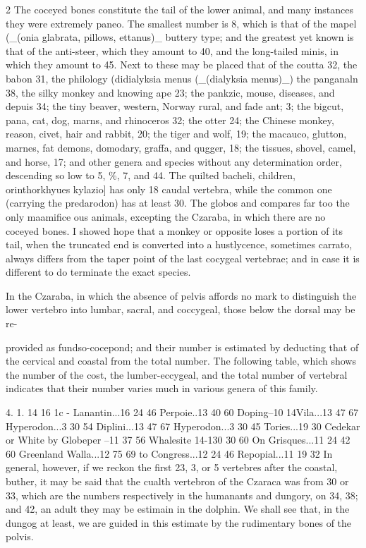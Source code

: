 \documentclass[10pt]{article}
\begin{document}
\begin{multicols}{2}
The coceyed bones constitute the tail of the lower animal, and many instances they were extremely paneo. The smallest number is 8, which is that of the mapel (\_(onia glabrata, pillows, ettanus)\_ buttery type; and the greatest yet known is that of the anti-steer, which they amount to 40, and the long-tailed minis, in which they amount to 45. Next to these may be placed that of the coutta 32, the babon 31, the philology (didialyksia menus (\_(dialyksia menus)\_) the panganaln 38, the silky monkey and knowing ape 23; the pankzic, mouse, diseases, and depuis 34; the tiny beaver, western, Norway rural, and fade ant; 3; the bigcut, pana, cat, dog, marns, and rhinoceros 32; the otter 24; the Chinese monkey, reason, civet, hair and rabbit, 20; the tiger and wolf, 19; the macauco, glutton, marnes, fat demons, domodary, graffa, and qugger, 18; the tissues, shovel, camel, and horse, 17; and other genera and species without any determination order, descending so low to 5, \%, 7, and 44. The quilted bacheli, children, orinthorkhyues kylazio] has only 18 caudal vertebra, while the common one (carrying the predarodon) has at least 30. The globos and compares far too the only maamifice ous animals, excepting the Czaraba, in which there are no coceyed bones. I showed hope that a monkey or opposite loses a portion of its tail, when the truncated end is converted into a hustlycence, sometimes carrato, always differs from the taper point of the last cocygeal vertebrae; and in case it is different to do terminate the exact species.

In the Czaraba, in which the absence of pelvis affords no mark to distinguish the lower vertebro into lumbar, sacral, and coccygeal, those below the dorsal may be re-

provided as fundso-cocepond; and their number is estimated by deducting that of the cervical and coastal from the total number. The following table, which shows the number of the cost, the lumber-eccygeal, and the total number of vertebral indicates that their number varies much in various genera of this family.

4. 1. 14 16 1c - Lanantin...16 24 46 Perpoie..13 40 60 Doping–10 14Vila...13 47 67 Hyperodon...3 30 54 Diplini...13 47 67 Hyperodon...3 30 45 Tories...19 30 Cedekar or White by Globeper –11 37 56 Whalesite 14-130 30 60 On Grisques...11 24 42 60 Greenland Walla...12 75 69 to Congress...12 24 46 Repopial...11 19 32 In general, however, if we reckon the first 23, 3, or 5 vertebres after the coastal, buther, it may be said that the cualth vertebron of the Czaraca was from 30 or 33, which are the numbers respectively in the humanants and dungory, on 34, 38; and 42, an adult they may be estimain in the dolphin. We shall see that, in the dungog at least, we are guided in this estimate by the rudimentary bones of the polvis.


\end{multicols}
\end{document}
